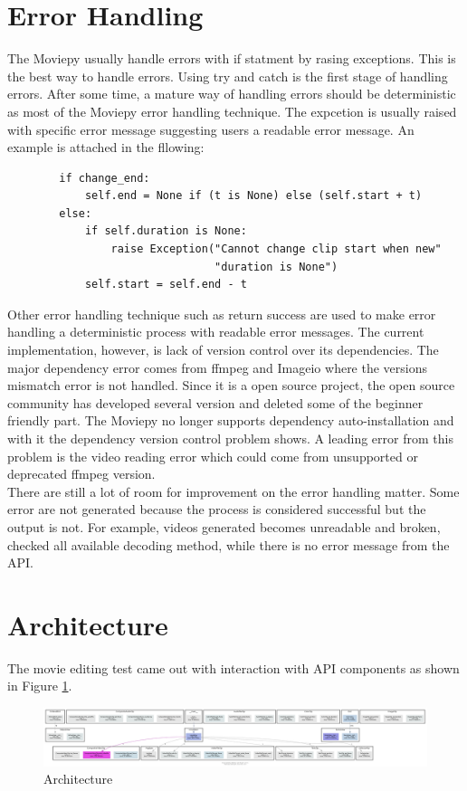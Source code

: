\documentclass[a4paper, 11pt]{article}
\begin{document}
\section{Error Handling}
The Moviepy usually handle errors with if statment by rasing exceptions. This is the best way to handle errors. Using try and catch is the first stage of handling errors. After some time, a mature way of handling errors should be deterministic as most of the Moviepy error handling technique. The expcetion is usually raised with specific error message suggesting users a readable error message. An example is attached in the fllowing:
\begin{lstlisting}
        if change_end:
            self.end = None if (t is None) else (self.start + t)
        else:
            if self.duration is None:
                raise Exception("Cannot change clip start when new"
                                "duration is None")
            self.start = self.end - t
\end{lstlisting}

Other error handling technique such as return success are used to make error handling a deterministic process with readable error messages. 
The current implementation, however, is lack of version control over its dependencies. The major dependency error comes from ffmpeg and Imageio where the versions mismatch error is not handled. Since it is a open source project, the open source community has developed several version and deleted some of the beginner friendly part. The Moviepy no longer supports dependency auto-installation and with it the dependency version control problem shows. A leading error from this problem is the video reading error which could come from unsupported or deprecated ffmpeg version.\\

There are still a lot of room for improvement on the error handling matter. Some error are not generated because the process is considered successful but the output is not. For example, videos generated becomes unreadable and broken, checked all available decoding method, while there is no error message from the API. 

\section{Architecture}
The movie editing test came out with interaction with API components as shown in Figure \ref{figure:graph}.

\begin{figure}[ht]
  \centering
  \includegraphics[width=\linewidth]{pycallgraph.png}
  \caption{Architecture}
   \label{figure:graph}
  \end{figure}
\FloatBarrier
\end{document}
